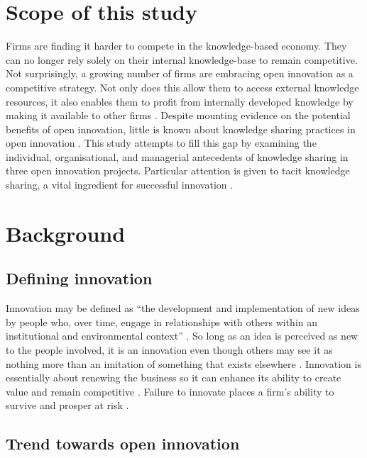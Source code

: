
\section{Scope of this study}

Firms are finding it harder to compete in the knowledge-based economy. They can no longer rely solely on their internal knowledge-base to remain competitive. Not surprisingly, a growing number of firms are embracing open innovation as a competitive strategy. Not only does this allow them to access external knowledge resources, it also enables them to profit from internally developed knowledge by making it available to other firms \citep{laursen2006open,chesbrough2013managing,stanko2017under}. Despite mounting evidence on the potential benefits of open innovation, little is known about knowledge sharing practices in open innovation \citep{lakemond2016match}. This study attempts to fill this gap by examining the individual, organisational, and managerial antecedents of knowledge sharing in three open innovation projects. Particular attention is given to tacit knowledge sharing, a vital ingredient for successful innovation \citep{leonard1998role,koskinen2002role,cavusgil2003tacit,seidler2008use,leonard2014knowledge}.

\section{Background}

\subsection{Defining innovation}

Innovation may be defined as \enquote{the development and implementation of new ideas by people who, over time, engage in relationships with others within an institutional and environmental context} \citep[][pg.]{van1986central}. So long as an idea is perceived as new to the people involved, it is an innovation even though others may see it as nothing more than an imitation of something that exists elsewhere \citep{van1986central}. Innovation is essentially about renewing the business so it can enhance its ability to create value and remain competitive \citep{schumpeter1950capitalism}. Failure to innovate places a firm's ability to survive and prosper at risk \citep{bessant2005managing}. \medskip

\subsection{Trend towards open innovation}

